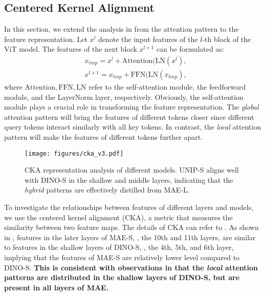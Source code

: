 \subsection{Centered Kernel Alignment}
\label{app:CKA}
In this section, we extend the analysis in  from the attention pattern to the feature representation. Let $x^l$ denote the input features of the $l$-th block of the ViT model. The features of the next block $x^{l+1}$ can be formulated as:
\begin{align}
    &x_{tmp} = x^l + \text{Attention}(\text{LN}(x^l), \\
    &x^{l+1} = x_{tmp} + \text{FFN}(\text{LN}(x_{tmp}),
\end{align}
where $\text{Attention},\text{FFN},\text{LN}$ refer to the self-attention module, the feedforward module, and the LayerNorm layer, respectively. Obviously, the self-attention module plays a crucial role in transforming the feature representation. The \textit{global} attention pattern will bring the features of different tokens closer since different query tokens interact similarly with all key tokens. In contrast, the \textit{local} attention pattern will make the features of different tokens further apart.

\begin{figure}[t]
\centering
\texttt{[image: figures/cka\_v3.pdf]}
\vspace{-22pt}
\caption{CKA representation analysis of different models. UNIP-S aligns well with DINO-S in the shallow and middle layers, indicating that the \textit{hybrid} patterns are effectively distilled from MAE-L.}
\label{fig:cka}
\vspace{-15pt}
\end{figure}

To investigate the relationships between features of different layers and models, we use the centered kernel alignment (CKA), a metric that measures the similarity between two feature maps. The details of CKA can refer to \citet{CKA}. As shown in , features in the later layers of MAE-S, \eg, the 10th and 11th layers, are similar to features in the shallow layers of DINO-S, \eg, the 4th, 5th, and 6th layer, implying that the features of MAE-S are relatively lower level compared to DINO-S. \textbf{This is consistent with observations in  that the \textit{local} attention patterns are distributed in the shallow layers of DINO-S, but are present in all layers of MAE.}

